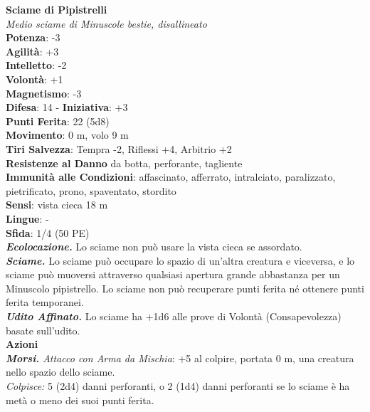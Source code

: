 \begin{multicols}{2}
\medskip\textbf{Sciame di Pipistrelli}\\
\emph{Medio sciame di Minuscole bestie, disallineato}\\
\textbf{Potenza}: -3\\
\textbf{Agilità}: +3\\
\textbf{Intelletto}: -2\\
\textbf{Volontà}: +1\\
\textbf{Magnetismo}: -3\\
\textbf{Difesa}: 14 - \textbf{Iniziativa}: +3\\
\textbf{Punti Ferita}: 22 (5d8)\\
\textbf{Movimento}: 0 m, volo 9 m\\
\textbf{Tiri Salvezza}: Tempra -2, Riflessi +4, Arbitrio +2\\
\textbf{Resistenze al Danno} da botta, perforante, tagliente\\
\textbf{Immunità alle Condizioni}: affascinato, afferrato, intralciato, paralizzato, pietrificato, prono, spaventato, stordito\\
\textbf{Sensi}: vista cieca 18 m\\
\textbf{Lingue}: -\\
\textbf{Sfida}: 1/4 (50 PE)\smallskip\\
\emph{\textbf{Ecolocazione.}} Lo sciame non può usare la vista cieca se assordato.\\
\emph{\textbf{Sciame.}} Lo sciame può occupare lo spazio di un'altra creatura e viceversa, e lo sciame può muoversi attraverso qualsiasi apertura grande abbastanza per un Minuscolo pipistrello. Lo sciame non può recuperare punti ferita né ottenere punti ferita temporanei.\\
\emph{\textbf{Udito Affinato.}} Lo sciame ha +1d6 alle prove di Volontà (Consapevolezza) basate sull'udito.\\
\smallskip\textbf{Azioni}\\
\emph{\textbf{Morsi.} Attacco con Arma da Mischia}: +5 al colpire, portata 0 m, una creatura nello spazio dello sciame.\\
\emph{Colpisce:} 5 (2d4) danni perforanti, o 2 (1d4) danni perforanti se lo sciame è ha metà o meno dei suoi punti ferita.\\


\end{multicols}
